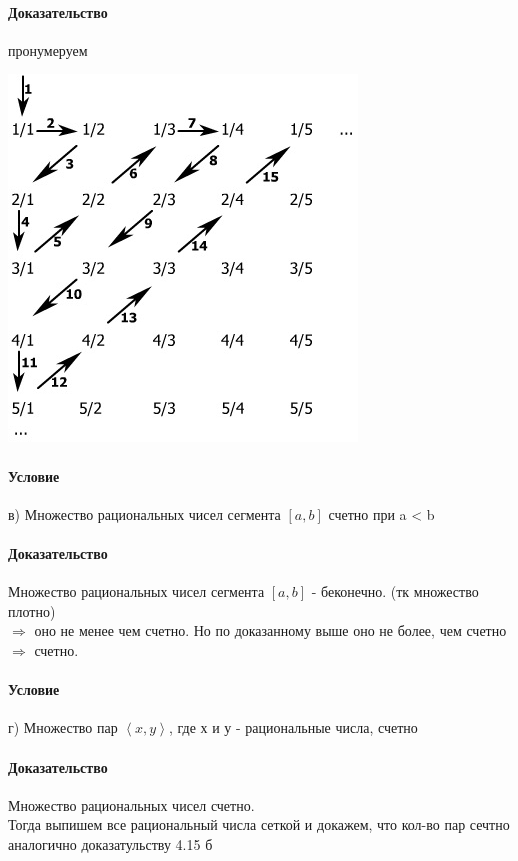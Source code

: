 \documentclass[a4paper,12pt]{article}
\begin{document}
\paragraph*{Доказательство}
пронумеруем\\
\begin{center}
    \includegraphics[scale=0.5]{image008.jpg}
\end{center}
\paragraph*{Условие}
в) Множество рациональных чисел сегмента $\left[ a, b\right] $ счетно при a < b
\paragraph*{Доказательство}
Множество рациональных чисел сегмента $\left[ a, b\right] $ - беконечно. (тк множество плотно)\\
$\Rightarrow$ оно не менее чем счетно. Но по доказанному выше оно не более, чем счетно $\Rightarrow$ счетно.
\paragraph*{Условие}
г) Множество пар $ \left\langle  x, y \right\rangle $, где х и у - рациональные числа, счетно
\paragraph*{Доказательство}
Множество рациональных чисел счетно.\\
Тогда выпишем все рациональный числа сеткой и докажем, что кол-во пар сечтно аналогично доказатульству 4.15 б\\
\end{document}
